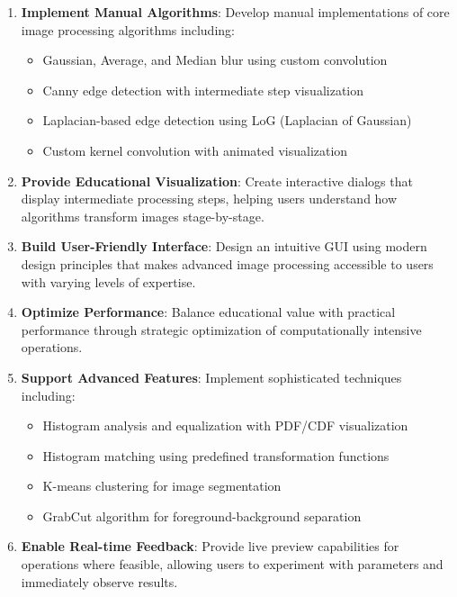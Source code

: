 \documentclass[12pt,a4paper]{article}
\begin{document}
\begin{enumerate}[leftmargin=*]
    \item \textbf{Implement Manual Algorithms}: Develop manual implementations of core image processing algorithms including:
    \begin{itemize}
        \item Gaussian, Average, and Median blur using custom convolution
        \item Canny edge detection with intermediate step visualization
        \item Laplacian-based edge detection using LoG (Laplacian of Gaussian)
        \item Custom kernel convolution with animated visualization
    \end{itemize}

    \item \textbf{Provide Educational Visualization}: Create interactive dialogs that display intermediate processing steps, helping users understand how algorithms transform images stage-by-stage.

    \item \textbf{Build User-Friendly Interface}: Design an intuitive GUI using modern design principles that makes advanced image processing accessible to users with varying levels of expertise.

    \item \textbf{Optimize Performance}: Balance educational value with practical performance through strategic optimization of computationally intensive operations.

    \item \textbf{Support Advanced Features}: Implement sophisticated techniques including:
    \begin{itemize}
        \item Histogram analysis and equalization with PDF/CDF visualization
        \item Histogram matching using predefined transformation functions
        \item K-means clustering for image segmentation
        \item GrabCut algorithm for foreground-background separation
    \end{itemize}

    \item \textbf{Enable Real-time Feedback}: Provide live preview capabilities for operations where feasible, allowing users to experiment with parameters and immediately observe results.
\end{enumerate}
\end{document}
